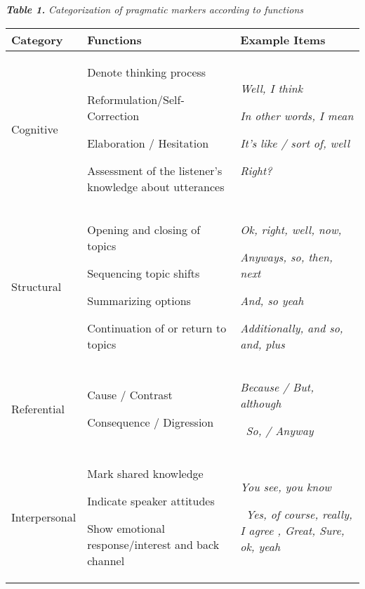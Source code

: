 \documentclass[12pt]{article}
\newenvironment{stylelsTable}{\setlength\leftskip{0cm}\setlength\rightskip{0cm}\setlength\parindent{0cm}\setlength\parfillskip{0pt plus 1fil}\setlength\parskip{0.0201in plus 0.00201in}\writerlistparindent\writerlistleftskip\leavevmode\normalfont\normalsize\mdseries\writerlistlabel\ignorespaces}{\unskip\vspace{0in plus 1pt}\par}
\newcommand\writerlistleftskip{}
\newcommand\writerlistparindent{}
\newcommand\writerlistlabel{}
\begin{document}
\begin{stylelsTable}
\textbf{\textit{Table 1.}}\textit{ Categorization of pragmatic markers according to functions}
\end{stylelsTable}

\begin{flushleft}
\tablehead{}
\begin{supertabular}{m{1.0927598in}m{1.9733598in}m{1.6170598in}}
\hline
\bfseries Category  &
\bfseries Functions &
\bfseries Example Items\\\hline
\mdseries Cognitive &
{\mdseries Denote thinking process}

{\mdseries Reformulation/Self-Correction}

{\mdseries Elaboration / Hesitation}

\mdseries Assessment of the listener’s knowledge about utterances &
{\mdseries \textit{Well, I think}}

{\mdseries \textit{In other words, I mean}}

{\mdseries \textit{It’s like / sort of, well}}

\mdseries \textit{Right? }\\\hline
\mdseries Structural &
{\mdseries Opening and closing of topics}

{\mdseries Sequencing topic shifts}

{\mdseries Summarizing options}

\mdseries Continuation of or return to topics &
{\mdseries \textit{Ok, right, well, now, }}

{\mdseries \textit{Anyways, so, then, next}}

{\mdseries \textit{And, so yeah}}

\mdseries \textit{Additionally, and so, and, plus }\\\hline
\mdseries Referential &
{\mdseries Cause / Contrast}

\mdseries Consequence / Digression  &
{\mdseries \textit{Because / But, although}}

\mdseries \textit{\ So, / Anyway}\\\hline
\mdseries Interpersonal &
{\mdseries Mark shared knowledge}

{\mdseries Indicate speaker attitudes }

\mdseries Show emotional response/interest and back channel  &
{\mdseries \textit{You see, you know}}

\mdseries \textit{\ Yes, of course, really, I agree , Great, Sure, ok, yeah }\\\hline
\end{supertabular}
\end{flushleft}
\end{document}

